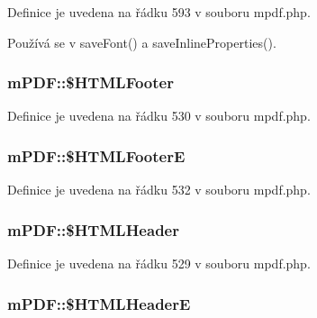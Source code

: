 Definice je uvedena na řádku 593 v souboru mpdf.\-php.



Používá se v save\-Font() a save\-Inline\-Properties().

\hypertarget{classm_p_d_f_ad58be6079672039077739a61dd7e5c2f}{
\subsubsection[{\$\-H\-T\-M\-L\-Footer}]{\setlength{\rightskip}{0pt plus 5cm}m\-P\-D\-F\-::\$\-H\-T\-M\-L\-Footer}}\label{classm_p_d_f_ad58be6079672039077739a61dd7e5c2f}


Definice je uvedena na řádku 530 v souboru mpdf.\-php.

\hypertarget{classm_p_d_f_a7d32b9cec71347d86fafef4ba4f04af4}{
\subsubsection[{\$\-H\-T\-M\-L\-Footer\-E}]{\setlength{\rightskip}{0pt plus 5cm}m\-P\-D\-F\-::\$\-H\-T\-M\-L\-Footer\-E}}\label{classm_p_d_f_a7d32b9cec71347d86fafef4ba4f04af4}


Definice je uvedena na řádku 532 v souboru mpdf.\-php.

\hypertarget{classm_p_d_f_a4593a4dfde9d9dafd87530f342f90fa4}{
\subsubsection[{\$\-H\-T\-M\-L\-Header}]{\setlength{\rightskip}{0pt plus 5cm}m\-P\-D\-F\-::\$\-H\-T\-M\-L\-Header}}\label{classm_p_d_f_a4593a4dfde9d9dafd87530f342f90fa4}


Definice je uvedena na řádku 529 v souboru mpdf.\-php.

\hypertarget{classm_p_d_f_a151a84595462704dd12a7c1bb4dd80b6}{
\subsubsection[{\$\-H\-T\-M\-L\-Header\-E}]{\setlength{\rightskip}{0pt plus 5cm}m\-P\-D\-F\-::\$\-H\-T\-M\-L\-Header\-E}}\label{classm_p_d_f_a151a84595462704dd12a7c1bb4dd80b6}


